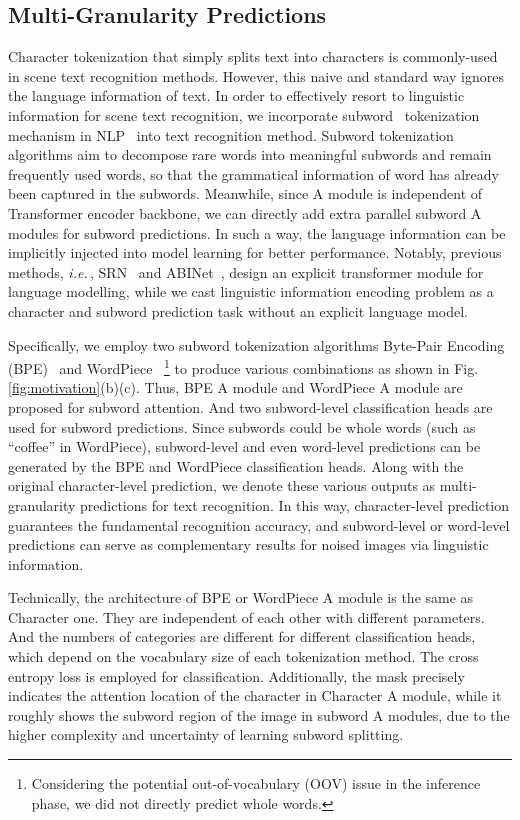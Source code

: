 \documentclass[runningheads]{llncs}
\def\ie{\emph{i.e.}\,}
\begin{document}
\subsection{Multi-Granularity Predictions}
\label{sec:MGP}
Character tokenization that simply splits text into characters is commonly-used in scene text recognition methods.
However, this naive and standard way ignores the language information of text. 
In order to effectively resort to linguistic information for scene text recognition, we incorporate subword~\cite{subword} tokenization mechanism in NLP~\cite{BERT} into text recognition method. Subword tokenization algorithms aim to decompose rare words into meaningful subwords and remain frequently used words, so that the grammatical information of word has already been captured in the  subwords. Meanwhile, since A module is independent of Transformer encoder backbone, we can directly add extra parallel subword A modules for subword predictions. 
In such a way, the language information can be implicitly injected into model learning for better performance. Notably, previous methods, \ie, SRN~\cite{SRN} and ABINet~\cite{ABInet}, design an explicit transformer module for language modelling, while we cast linguistic information encoding problem as a character and subword prediction task without an explicit  language model. 

Specifically, we employ two subword tokenization algorithms Byte-Pair Encoding (BPE)~\cite{BPE} and WordPiece~\cite{wordpiece}
\footnote{Considering the potential out-of-vocabulary (OOV) issue in the inference phase, we did not directly predict whole words.} 
to produce various combinations as shown in Fig.\ref{fig:motivation}(b)(c). 
Thus, BPE A module and WordPiece A module are proposed for subword attention.
And two subword-level classification heads are used for subword predictions.
Since subwords could be whole words (such as ``coffee'' in WordPiece), subword-level and even word-level predictions can be generated by the BPE and WordPiece classification heads. 
Along with the original character-level prediction, we denote these various outputs as multi-granularity predictions for text recognition. In this way, character-level prediction guarantees the fundamental recognition accuracy, and subword-level or word-level predictions can serve as complementary results for noised images via linguistic information. 

Technically, the architecture of BPE or WordPiece A module is the same as Character one. They are independent of each other with different parameters.
And the numbers of categories are different for different classification heads, which depend on the vocabulary size of each tokenization method.
The cross entropy loss is employed for classification.
Additionally, the mask  precisely indicates the attention location of the  character in Character A module, 
while it roughly shows the  subword region of the image in subword A modules, due to the higher complexity and uncertainty of learning subword splitting. 
\end{document}

